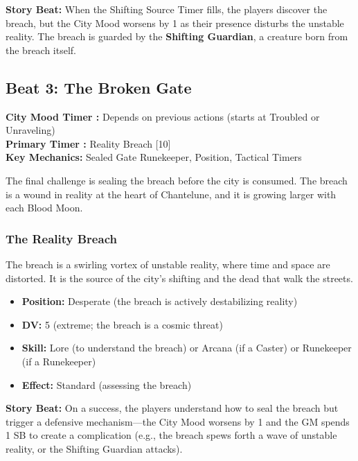 \documentclass{article}
\begin{document}
\begin{storybox}
\textbf{Story Beat:} When the Shifting Source Timer fills, the players discover the breach, but the City Mood worsens by 1 as their presence disturbs the unstable reality. The breach is guarded by the \textbf{Shifting Guardian}, a creature born from the breach itself.
\end{storybox}

\subsection{Beat 3: The Broken Gate}

\begin{mechanicbox}
\textbf{City Mood Timer :} Depends on previous actions (starts at Troubled or Unraveling) \\
\textbf{Primary Timer :} Reality Breach [10] \\
\textbf{Key Mechanics:} Sealed Gate Runekeeper, Position, Tactical Timers
\end{mechanicbox}

The final challenge is sealing the breach before the city is consumed. The breach is a wound in reality at the heart of Chantelune, and it is growing larger with each Blood Moon.

\subsubsection{The Reality Breach}

The breach is a swirling vortex of unstable reality, where time and space are distorted. It is the source of the city's shifting and the dead that walk the streets.

\begin{itemize}
    \item \textbf{Position:} Desperate (the breach is actively destabilizing reality)
    \item \textbf{DV:} 5 (extreme; the breach is a cosmic threat)
    \item \textbf{Skill:} Lore (to understand the breach) or Arcana (if a Caster) or Runekeeper (if a Runekeeper)
    \item \textbf{Effect:} Standard (assessing the breach)
\end{itemize}

\begin{storybox}
\textbf{Story Beat:} On a success, the players understand how to seal the breach but trigger a defensive mechanism---the City Mood worsens by 1 and the GM spends 1 SB to create a complication (e.g., the breach spews forth a wave of unstable reality, or the Shifting Guardian attacks).
\end{storybox}
\end{document}
